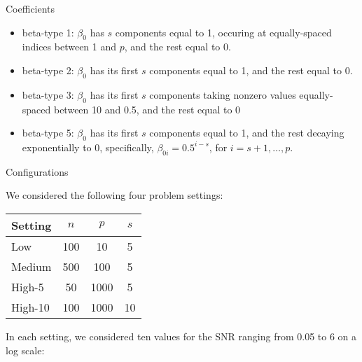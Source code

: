 \documentclass[blue, 10pt]{beamer}
\begin{document}
\begin{frame}{Coefficients}

  \begin{itemize}
    \item beta-type 1: $\beta_0$ has $s$ components equal to 1, occuring at equally-spaced indices between 1 and $p$, and the rest equal to 0.
    \item beta-type 2: $\beta_0$ has its first $s$ components equal to 1, and the rest equal to 0.
    \item beta-type 3: $\beta_0$ has its first $s$ components taking nonzero values equally-spaced between 10 and 0.5, and the rest equal to 0
    \item beta-type 5: $\beta_0$ has its first $s$ components equal to 1, and the rest decaying exponentially to 0, specifically, $\beta_{0i} = 0.5^{i-s}$, for $i = s + 1, \dots, p$.
  \end{itemize}

\end{frame}


\begin{frame}{Configurations}

  We considered the following four problem settings:

  \begin{center}
    \begin{tabular}{l|ccc}
      \hline
          Setting & $n$ & $p$ & $s$ \\
      \hline
          Low & 100 & 10 & 5 \\
          Medium & 500 & 100 & 5 \\
          High-5 & 50 & 1000 & 5 \\
          High-10 & 100 & 1000 & 10 \\
      \hline
    \end{tabular}
  \end{center}

  In each setting, we considered ten values for the SNR ranging from 0.05 to 6 on a log scale:

  \begin{table}[!h]
  \end{table}

\end{frame}
\end{document}
